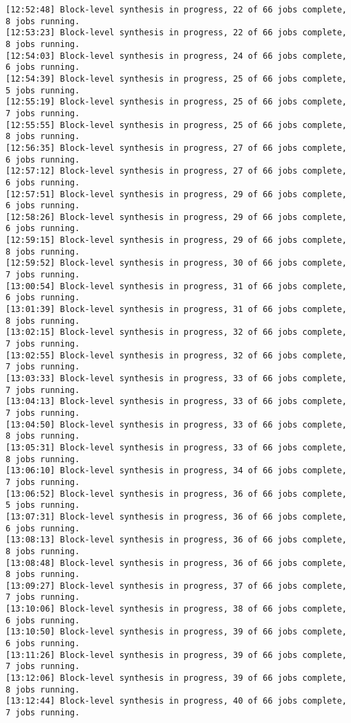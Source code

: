 \begin{lstlisting}[label=func,breaklines=true,breakatwhitespace=false,caption=СОДЕРЖИМОЕ LOG-ФАЙЛА.]
[12:52:48] Block-level synthesis in progress, 22 of 66 jobs complete, 8 jobs running.
[12:53:23] Block-level synthesis in progress, 22 of 66 jobs complete, 8 jobs running.
[12:54:03] Block-level synthesis in progress, 24 of 66 jobs complete, 6 jobs running.
[12:54:39] Block-level synthesis in progress, 25 of 66 jobs complete, 5 jobs running.
[12:55:19] Block-level synthesis in progress, 25 of 66 jobs complete, 7 jobs running.
[12:55:55] Block-level synthesis in progress, 25 of 66 jobs complete, 8 jobs running.
[12:56:35] Block-level synthesis in progress, 27 of 66 jobs complete, 6 jobs running.
[12:57:12] Block-level synthesis in progress, 27 of 66 jobs complete, 6 jobs running.
[12:57:51] Block-level synthesis in progress, 29 of 66 jobs complete, 6 jobs running.
[12:58:26] Block-level synthesis in progress, 29 of 66 jobs complete, 6 jobs running.
[12:59:15] Block-level synthesis in progress, 29 of 66 jobs complete, 8 jobs running.
[12:59:52] Block-level synthesis in progress, 30 of 66 jobs complete, 7 jobs running.
[13:00:54] Block-level synthesis in progress, 31 of 66 jobs complete, 6 jobs running.
[13:01:39] Block-level synthesis in progress, 31 of 66 jobs complete, 8 jobs running.
[13:02:15] Block-level synthesis in progress, 32 of 66 jobs complete, 7 jobs running.
[13:02:55] Block-level synthesis in progress, 32 of 66 jobs complete, 7 jobs running.
[13:03:33] Block-level synthesis in progress, 33 of 66 jobs complete, 7 jobs running.
[13:04:13] Block-level synthesis in progress, 33 of 66 jobs complete, 7 jobs running.
[13:04:50] Block-level synthesis in progress, 33 of 66 jobs complete, 8 jobs running.
[13:05:31] Block-level synthesis in progress, 33 of 66 jobs complete, 8 jobs running.
[13:06:10] Block-level synthesis in progress, 34 of 66 jobs complete, 7 jobs running.
[13:06:52] Block-level synthesis in progress, 36 of 66 jobs complete, 5 jobs running.
[13:07:31] Block-level synthesis in progress, 36 of 66 jobs complete, 6 jobs running.
[13:08:13] Block-level synthesis in progress, 36 of 66 jobs complete, 8 jobs running.
[13:08:48] Block-level synthesis in progress, 36 of 66 jobs complete, 8 jobs running.
[13:09:27] Block-level synthesis in progress, 37 of 66 jobs complete, 7 jobs running.
[13:10:06] Block-level synthesis in progress, 38 of 66 jobs complete, 6 jobs running.
[13:10:50] Block-level synthesis in progress, 39 of 66 jobs complete, 6 jobs running.
[13:11:26] Block-level synthesis in progress, 39 of 66 jobs complete, 7 jobs running.
[13:12:06] Block-level synthesis in progress, 39 of 66 jobs complete, 8 jobs running.
[13:12:44] Block-level synthesis in progress, 40 of 66 jobs complete, 7 jobs running.

\end{lstlisting}
